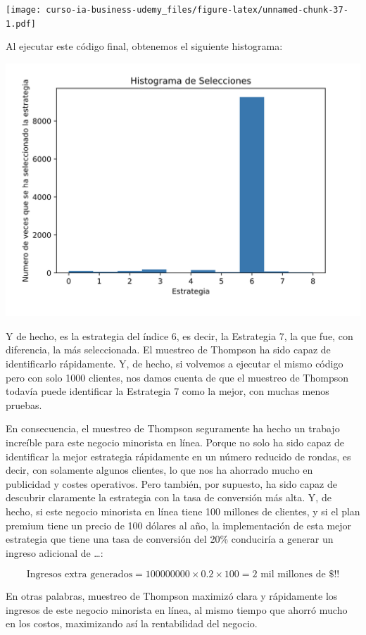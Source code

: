 \documentclass[
]{book}
\begin{document}
\texttt{[image: curso-ia-business-udemy\_files/figure-latex/unnamed-chunk-37-1.pdf]}

Al ejecutar este código final, obtenemos el siguiente histograma:

\includegraphics{Images/Histogram.png}

Y de hecho, es la estrategia del índice 6, es decir, la Estrategia 7, la que fue, con diferencia, la más seleccionada. El muestreo de Thompson ha sido capaz de identificarlo rápidamente. Y, de hecho, si volvemos a ejecutar el mismo código pero con solo 1000 clientes, nos damos cuenta de que el muestreo de Thompson todavía puede identificar la Estrategia 7 como la mejor, con muchas menos pruebas.

En consecuencia, el muestreo de Thompson seguramente ha hecho un trabajo increíble para este negocio minorista en línea. Porque no solo ha sido capaz de identificar la mejor estrategia rápidamente en un número reducido de rondas, es decir, con solamente algunos clientes, lo que nos ha ahorrado mucho en publicidad y costes operativos. Pero también, por supuesto, ha sido capaz de descubrir claramente la estrategia con la tasa de conversión más alta. Y, de hecho, si este negocio minorista en línea tiene 100 millones de clientes, y si el plan premium tiene un precio de 100 dólares al año, la implementación de esta mejor estrategia que tiene una tasa de conversión del 20\% conduciría a generar un ingreso adicional de \ldots:

\[\textrm{Ingresos extra generados} = 100000000 \times 0.2 \times 100 = \textrm{2 mil millones de }\$!!\]

En otras palabras, muestreo de Thompson maximizó clara y rápidamente los ingresos de este negocio minorista en línea, al mismo tiempo que ahorró mucho en los costos, maximizando así la rentabilidad del negocio.
\end{document}
